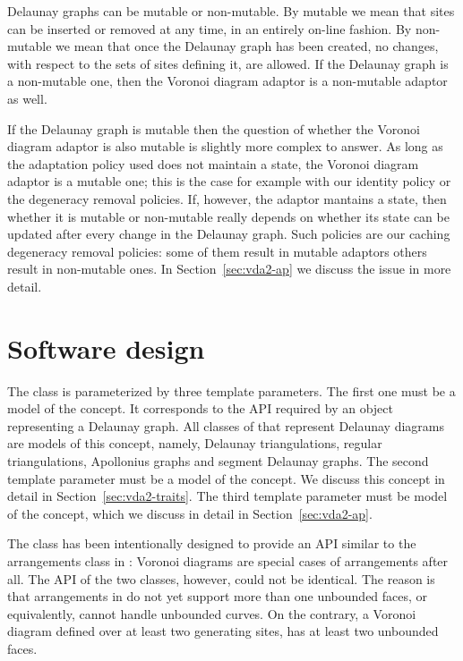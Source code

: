 Delaunay graphs can be mutable or non-mutable. By mutable we mean that
sites can be inserted or removed at any time, in an entirely on-line
fashion. By non-mutable we mean that once the Delaunay graph has been
created, no changes, with respect to the sets of sites defining it,
are allowed. If the Delaunay graph is a non-mutable one, then the
Voronoi diagram adaptor is a non-mutable adaptor as well.

If the Delaunay graph is mutable then the question of whether the
Voronoi diagram adaptor is also mutable is slightly more complex to
answer. As long as the adaptation policy used does not maintain a
state, the Voronoi diagram adaptor is a mutable one; this is the case
for example with our identity policy or the degeneracy removal
policies. If, however, the adaptor mantains a state, then whether it
is mutable or non-mutable really depends on whether its state can be
updated after every change in the Delaunay graph. Such policies are
our caching degeneracy removal policies: some of them result in
mutable adaptors others result in non-mutable ones. In
Section~\ref{sec:vda2-ap} we discuss the issue in more detail.




\section{Software design}
\label{sec:vda2-design}

The  class is parameterized by
three template parameters. The first one must be a model of the
 concept. It corresponds to the API required by
an object representing a Delaunay graph. All classes of \cgal{} that
represent Delaunay diagrams are models of this concept, namely,
Delaunay triangulations, regular triangulations, Apollonius 
graphs and segment Delaunay graphs.
%
The second template parameter must be a model of the
 concept. We discuss this concept in detail in
Section~\ref{sec:vda2-traits}.
%
The third template parameter must be model of the
 concept, which we discuss in detail in
Section~\ref{sec:vda2-ap}.

The  class has been
intentionally designed to provide an API similar to the arrangements
class in \cgal: Voronoi diagrams are special cases of arrangements
after all. The API of the two classes, however, could not be
identical. The reason is that arrangements in \cgal{} do not yet support
more than one unbounded faces, or equivalently, cannot handle
unbounded curves. On the contrary, a Voronoi diagram defined over at
least two generating sites, has at least two unbounded faces.

